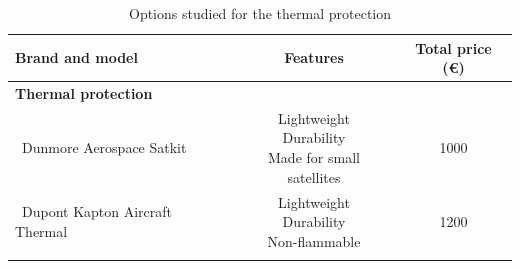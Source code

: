\begin{longtable}{| l | c | c | }
\hline
\rowcolor[gray]{0.80}	\textbf{Brand and model} &  \textbf{Features}     & \textbf{Total price (\euro)}   \\
\hline
\endfirsthead
\rowcolor[gray]{0.85} \textbf{Thermal protection} &  &  \\
	   ~Dunmore Aerospace Satkit & \makecell{Lightweight \\ Durability \\ Made for small satellites}& 1000 \\
	   \hline
	   ~Dupont Kapton Aircraft Thermal & \makecell{Lightweight \\ Durability \\ Non-flammable} & 1200 \\
	\hline

\caption{Options studied for the thermal protection}
\label{thermaloptions}
\end{longtable}